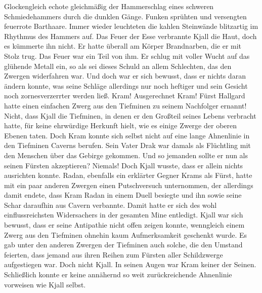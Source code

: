 \documentclass[10pt, a4paper, oneside]{book}
\begin{document}
\begin{multicols}{2}
Glockengleich echote gleichmäßig der Hammerschlag eines schweren Schmiedehammers durch die dunklen Gänge. Funken sprühten und versengten feuerrote Barthaare. Immer wieder leuchteten die kahlen Steinwände blitzartig im Rhythmus des Hammers auf. Das Feuer der Esse verbrannte Kjall die Haut, doch es kümmerte ihn nicht. Er hatte überall am Körper Brandnarben, die er mit Stolz trug. Das Feuer war ein Teil von ihm. Er schlug mit voller Wucht auf das glühende Metall ein, so als sei dieses Schuld an allem Schlechten, das den Zwergen widerfahren war. Und doch war er sich bewusst, dass er nichts daran ändern konnte, was seine Schläge allerdings nur noch heftiger und sein Gesicht noch zornesverzerrter werden ließ. Kram! Ausgerechnet Kram! Fürst Hallgard hatte einen einfachen Zwerg aus den Tiefminen zu seinem Nachfolger ernannt! Nicht, dass Kjall die Tiefminen, in denen er den Großteil seines Lebens verbracht hatte, für keine ehrwürdige Herkunft hielt, wie es einige Zwerge der oberen Ebenen taten. Doch Kram konnte sich selbst nicht auf eine lange Ahnenlinie in den Tiefminen Caverns berufen. Sein Vater Drak war damals als Flüchtling mit den Menschen über das Gebirge gekommen. Und so jemanden sollte er nun als seinen Fürsten akzeptieren? Niemals! Doch Kjall wusste, dass er allein nichts ausrichten konnte. Radan, ebenfalls ein erklärter Gegner Krams als Fürst, hatte mit ein paar anderen Zwergen einen Putschversuch unternommen, der allerdings damit endete, dass Kram Radan in einem Duell besiegte und ihn sowie seine Schar daraufhin aus Cavern verbannte. Damit hatte er sich des wohl einflussreichsten Widersachers in der gesamten Mine entledigt. Kjall war sich bewusst, dass er seine Antipathie nicht offen zeigen konnte, wenngleich einem Zwerg aus den Tiefminen ohnehin kaum Aufmerksamkeit geschenkt wurde. Es gab unter den anderen Zwergen der Tiefminen auch solche, die den Umstand feierten, dass jemand aus ihren Reihen zum Fürsten aller Schildzwerge aufgestiegen war. Doch nicht Kjall. In seinen Augen war Kram keiner der Seinen. Schließlich konnte er keine annähernd so weit zurückreichende Ahnenlinie vorweisen wie Kjall selbst.\bigskip


\end{multicols}
\end{document}
